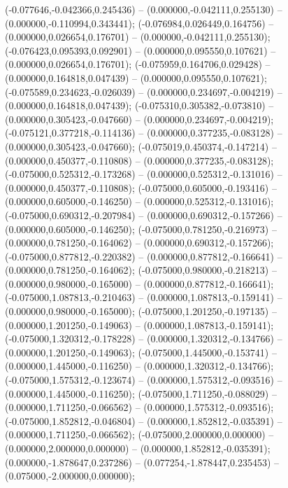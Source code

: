  (-0.077646,-0.042366,0.245436) -- (0.000000,-0.042111,0.255130) -- (0.000000,-0.110994,0.343441);
 (-0.076984,0.026449,0.164756) -- (0.000000,0.026654,0.176701) -- (0.000000,-0.042111,0.255130);
 (-0.076423,0.095393,0.092901) -- (0.000000,0.095550,0.107621) -- (0.000000,0.026654,0.176701);
 (-0.075959,0.164706,0.029428) -- (0.000000,0.164818,0.047439) -- (0.000000,0.095550,0.107621);
 (-0.075589,0.234623,-0.026039) -- (0.000000,0.234697,-0.004219) -- (0.000000,0.164818,0.047439);
 (-0.075310,0.305382,-0.073810) -- (0.000000,0.305423,-0.047660) -- (0.000000,0.234697,-0.004219);
 (-0.075121,0.377218,-0.114136) -- (0.000000,0.377235,-0.083128) -- (0.000000,0.305423,-0.047660);
 (-0.075019,0.450374,-0.147214) -- (0.000000,0.450377,-0.110808) -- (0.000000,0.377235,-0.083128);
 (-0.075000,0.525312,-0.173268) -- (0.000000,0.525312,-0.131016) -- (0.000000,0.450377,-0.110808);
 (-0.075000,0.605000,-0.193416) -- (0.000000,0.605000,-0.146250) -- (0.000000,0.525312,-0.131016);
 (-0.075000,0.690312,-0.207984) -- (0.000000,0.690312,-0.157266) -- (0.000000,0.605000,-0.146250);
 (-0.075000,0.781250,-0.216973) -- (0.000000,0.781250,-0.164062) -- (0.000000,0.690312,-0.157266);
 (-0.075000,0.877812,-0.220382) -- (0.000000,0.877812,-0.166641) -- (0.000000,0.781250,-0.164062);
 (-0.075000,0.980000,-0.218213) -- (0.000000,0.980000,-0.165000) -- (0.000000,0.877812,-0.166641);
 (-0.075000,1.087813,-0.210463) -- (0.000000,1.087813,-0.159141) -- (0.000000,0.980000,-0.165000);
 (-0.075000,1.201250,-0.197135) -- (0.000000,1.201250,-0.149063) -- (0.000000,1.087813,-0.159141);
 (-0.075000,1.320312,-0.178228) -- (0.000000,1.320312,-0.134766) -- (0.000000,1.201250,-0.149063);
 (-0.075000,1.445000,-0.153741) -- (0.000000,1.445000,-0.116250) -- (0.000000,1.320312,-0.134766);
 (-0.075000,1.575312,-0.123674) -- (0.000000,1.575312,-0.093516) -- (0.000000,1.445000,-0.116250);
 (-0.075000,1.711250,-0.088029) -- (0.000000,1.711250,-0.066562) -- (0.000000,1.575312,-0.093516);
 (-0.075000,1.852812,-0.046804) -- (0.000000,1.852812,-0.035391) -- (0.000000,1.711250,-0.066562);
 (-0.075000,2.000000,0.000000) -- (0.000000,2.000000,0.000000) -- (0.000000,1.852812,-0.035391);
 (0.000000,-1.878647,0.237286) -- (0.077254,-1.878447,0.235453) -- (0.075000,-2.000000,0.000000);
